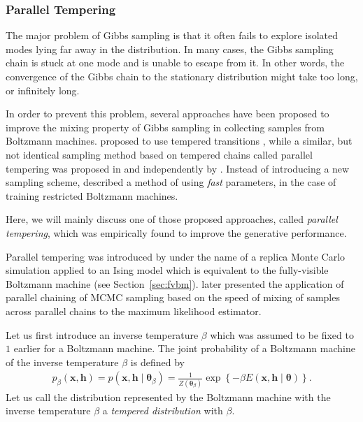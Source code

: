 \documentclass[dissertation,nocontribution,draft*]{aaltoseries}
\newcommand{\vect}[1]{\mathbf{#1}}
\newcommand{\vects}[1]{\boldsymbol{#1}}
\newcommand{\vh}[0]{\vect{h}}
\newcommand{\vx}[0]{\vect{x}}
\newcommand{\TT}[0]{{\vects{\theta}}}
\begin{document}
\subsubsection{Parallel Tempering}
\label{sec:parallel_tempering}


The major problem of Gibbs sampling is that it often
fails to explore isolated modes lying far away in the
distribution.  In many cases, the Gibbs sampling chain is
stuck at one mode and is unable to escape from it. In other
words, the convergence of the Gibbs chain to the stationary
distribution might take too long, or infinitely long.

In order to prevent this problem, several approaches have
been proposed to improve the mixing property of Gibbs
sampling in collecting samples from Boltzmann machines.
\citet{Salakhutdinov2009} proposed to use tempered
transitions \citep{Neal1994}, while a similar, but not
identical sampling method based on tempered chains called
parallel tempering was proposed in
 and independently by
\citet{Desjardins2010,Desjardins2010a}.  Instead of
introducing a new sampling scheme, \citet{Tieleman2009}
described a method of using \textit{fast} parameters,
in the case of training restricted Boltzmann
machines.

Here, we will mainly discuss one of those proposed
approaches, called \textit{parallel tempering}, which was
empirically found to improve the generative performance.

Parallel tempering was introduced by \citet{Swendsen1986}
under the name of a replica Monte Carlo simulation applied
to an Ising model which is equivalent to the fully-visible
Boltzmann machine (see Section~\ref{sec:fvbm}).
\citet{Geyer1991} later presented the application of
parallel chaining of MCMC sampling based on the speed of
mixing of samples across parallel chains to the maximum
likelihood estimator.

Let us first introduce an inverse temperature $\beta$
which was assumed to be fixed to $1$ earlier for a Boltzmann
machine. The joint probability
of a Boltzmann machine of the inverse temperature $\beta$ is defined by
\begin{align*}
    p_{\beta} (\vx, \vh) = p (\vx, \vh \mid \TT_\beta) =
    \frac{1}{Z(\TT_\beta)} \exp\left\{ -\beta E(\vx, \vh
    \mid \TT) \right\}.
\end{align*}
Let us call the distribution represented by the Boltzmann
machine with the inverse temperature $\beta$ a
\textit{tempered distribution} with $\beta$.
\end{document}
